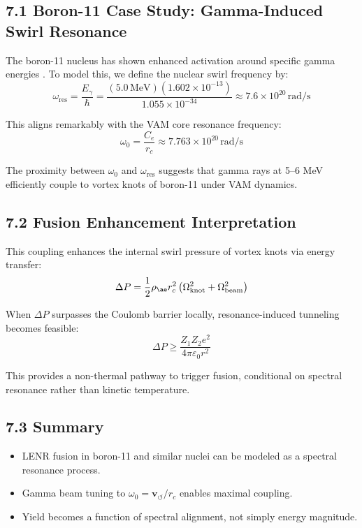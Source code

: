 \documentclass[a4paper, aps,preprint,superscriptaddress, 12pt]{revtex4}
\begin{document}
\subsection*{7.1 Boron-11 Case Study: Gamma-Induced Swirl Resonance}

The boron-11 nucleus has shown enhanced activation around specific gamma energies \cite{Goryachev2020}. To model this, we define the nuclear swirl frequency by:
\begin{equation}
\omega_{\text{res}} = \frac{E_{\gamma}}{\hbar} = \frac{(5.0 \, \text{MeV})(1.602 \times 10^{-13})}{1.055 \times 10^{-34}} \approx 7.6 \times 10^{20} \, \text{rad/s}
\end{equation}

This aligns remarkably with the VAM core resonance frequency:
\[ \omega_0 = \frac{C_e}{r_c} \approx 7.763 \times 10^{20} \, \text{rad/s} \]

The proximity between $\omega_0$ and $\omega_{\text{res}}$ suggests that gamma rays at 5--6 MeV efficiently couple to vortex knots of boron-11 under VAM dynamics.

\subsection*{7.2 Fusion Enhancement Interpretation}

This coupling enhances the internal swirl pressure of vortex knots via energy transfer:
\begin{equation}
\Delta P = \frac{1}{2} \rho_{\ae} r_c^2 \left( \Omega_{\text{knot}}^2 + \Omega_{\text{beam}}^2 \right)
\end{equation}

When $\Delta P$ surpasses the Coulomb barrier locally, resonance-induced tunneling becomes feasible:
\begin{equation}
\Delta P \geq \frac{Z_1 Z_2 e^2}{4\pi \varepsilon_0 r^2}
\end{equation}

This provides a non-thermal pathway to trigger fusion, conditional on spectral resonance rather than kinetic temperature.

\subsection*{7.3 Summary}

\begin{itemize}
  \item LENR fusion in boron-11 and similar nuclei can be modeled as a spectral resonance process.
  \item Gamma beam tuning to $\omega_0 = \mathbf{v}_{\scriptscriptstyle\boldsymbol{\circlearrowleft}} / r_c$ enables maximal coupling.
  \item Yield becomes a function of spectral alignment, not simply energy magnitude.
\end{itemize}
\end{document}
